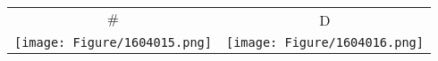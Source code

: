 \begin{table}[h]
\begin{tabular}{cc}
$\#$ & D \\
\texttt{[image: Figure/1604015.png]} &
\texttt{[image: Figure/1604016.png]} \\
\end{tabular}
\end{table}

